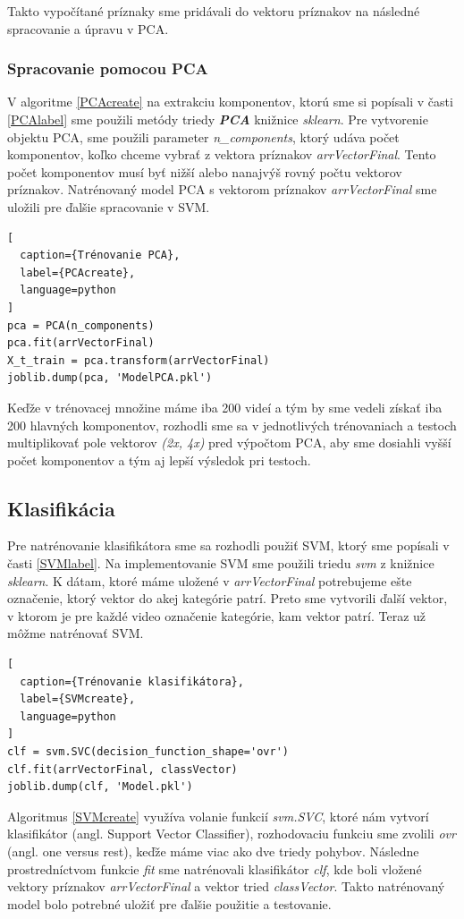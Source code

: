 Takto vypočítané príznaky sme pridávali do vektoru príznakov na následné spracovanie a úpravu v PCA.

\subsubsection{Spracovanie pomocou PCA} \label{PCAim}
V algoritme \ref{PCAcreate} na extrakciu komponentov, ktorú sme si popísali v časti \ref{PCAlabel} sme použili metódy triedy \textit{\textbf{PCA}} knižnice \textit{sklearn}. Pre vytvorenie objektu PCA, sme použili parameter \textit{n\_components}, ktorý udáva počet komponentov, koľko chceme vybrať z vektora príznakov \textit{arrVectorFinal}. Tento počet komponentov musí byť nižší alebo nanajvýš rovný počtu vektorov príznakov. Natrénovaný model PCA s vektorom príznakov \textit{arrVectorFinal} sme uložili pre ďalšie spracovanie v SVM.

\begin{lstlisting}[
  caption={Trénovanie PCA},
  label={PCAcreate},
  language=python
]
pca = PCA(n_components)
pca.fit(arrVectorFinal)
X_t_train = pca.transform(arrVectorFinal) 
joblib.dump(pca, 'ModelPCA.pkl')   
\end{lstlisting}

Keďže v trénovacej množine máme iba 200 videí a tým by sme vedeli získať iba 200 hlavných komponentov, rozhodli sme sa v jednotlivých trénovaniach a testoch multiplikovať pole vektorov \textit{(2x, 4x)}  pred výpočtom PCA, aby sme dosiahli vyšší počet komponentov a tým aj lepší výsledok pri testoch. 
  


\subsection{Klasifikácia}
Pre natrénovanie klasifikátora sme sa rozhodli použiť SVM, ktorý sme popísali v časti \ref{SVMlabel}. Na implementovanie SVM sme použili triedu \textit{svm} z knižnice \textit{sklearn}. K dátam, ktoré máme uložené v \textit{arrVectorFinal} potrebujeme ešte označenie, ktorý vektor do akej kategórie patrí. Preto sme vytvorili ďalší vektor, v ktorom je pre každé video označenie kategórie, kam vektor patrí. Teraz už môžme natrénovať SVM. 
\hfill \break
\begin{lstlisting}[
  caption={Trénovanie klasifikátora},
  label={SVMcreate},
  language=python
]
clf = svm.SVC(decision_function_shape='ovr')
clf.fit(arrVectorFinal, classVector)
joblib.dump(clf, 'Model.pkl') 
\end{lstlisting}
Algoritmus \ref{SVMcreate} využíva volanie funkcií \textit{svm.SVC}, ktoré nám vytvorí klasifikátor (angl. Support Vector Classifier), rozhodovaciu funkciu sme zvolili \textit{ovr} (angl. one versus rest), keďže máme viac ako dve triedy pohybov. Následne prostredníctvom funkcie \textit{fit} sme natrénovali klasifikátor \textit{clf}, kde boli vložené vektory príznakov \textit{arrVectorFinal} a vektor tried \textit{classVector}. Takto natrénovaný model bolo potrebné uložiť pre ďalšie použitie a testovanie. 

